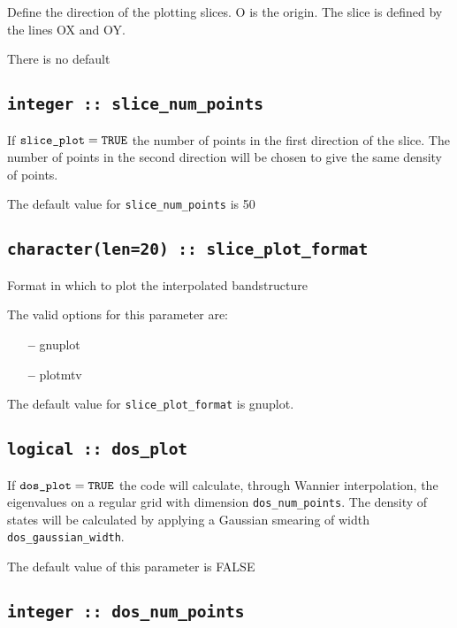Define the direction of the plotting slices. O is the origin. The slice
is defined by the lines OX and OY.

There is no default

\subsection[slice\_num\_points]{\tt integer :: slice\_num\_points}

If $\verb#slice_plot#=\verb#TRUE#$ the number of points in the first
direction of the slice. The number of points in the second direction
will be chosen to give the same density of points.

The default value for \verb#slice_num_points# is 50


\subsection[slice\_plot\_format]{\tt character(len=20) :: slice\_plot\_format}

Format in which to plot the interpolated bandstructure

The valid options for this parameter are:
\begin{itemize}
\item[{\bf --}] gnuplot
\item[{\bf --}] plotmtv
\end{itemize}

The default value for \verb#slice_plot_format# is gnuplot.




\subsection[dos\_plot]{\tt logical :: dos\_plot}

If $\verb#dos_plot#=\verb#TRUE#$ the code will calculate,
through Wannier interpolation, the
eigenvalues on a regular grid with dimension \verb#dos_num_points#. The
density of states will be calculated by applying a Gaussian smearing of
width \verb#dos_gaussian_width#.

The default value of this parameter is FALSE


\subsection[dos\_num\_points]{\tt integer :: dos\_num\_points}

